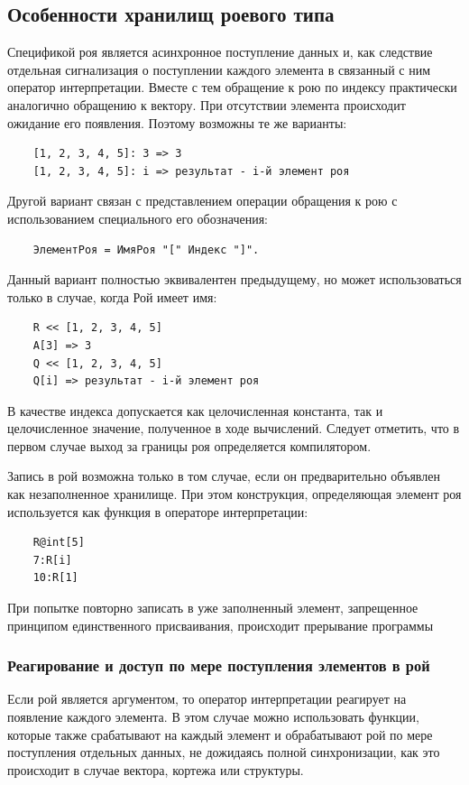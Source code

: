 \subsection{Особенности хранилищ роевого типа}

Спецификой роя является асинхронное поступление данных и, как следствие отдельная сигнализация о поступлении каждого элемента в связанный с ним оператор интерпретации. Вместе с тем обращение к рою по индексу практически аналогично обращению к вектору. При отсутствии элемента происходит ожидание его появления. Поэтому возможны те же варианты:
\begin{verbatim}
    [1, 2, 3, 4, 5]: 3 => 3
    [1, 2, 3, 4, 5]: i => результат - i-й элемент роя
\end{verbatim}

Другой вариант связан с представлением операции обращения к рою с использованием специального его обозначения:
\begin{verbatim}
    ЭлементРоя = ИмяРоя "[" Индекс "]".
\end{verbatim}

Данный вариант полностью эквивалентен предыдущему, но может использоваться только в случае, когда Рой имеет имя:
\begin{verbatim}
    R << [1, 2, 3, 4, 5]
    A[3] => 3
    Q << [1, 2, 3, 4, 5]
    Q[i] => результат - i-й элемент роя
\end{verbatim}
В качестве индекса допускается как целочисленная константа, так и целочисленное значение, полученное в ходе вычислений. Следует отметить, что в первом случае выход за границы роя определяется компилятором.

Запись в рой возможна только в том случае, если он предварительно объявлен как незаполненное хранилище. При этом конструкция, определяющая элемент роя используется как функция в операторе интерпретации:
\begin{verbatim}
    R@int[5]
    7:R[i]
    10:R[1]
\end{verbatim}
При попытке повторно записать в уже заполненный элемент, запрещенное принципом единственного присваивания, происходит прерывание программы

\subsubsection{Реагирование и доступ по мере поступления элементов в рой}

Если рой является аргументом, то оператор интерпретации реагирует на появление каждого элемента. В этом случае можно использовать функции, которые также срабатывают на каждый элемент и обрабатывают рой по мере поступления отдельных данных, не дожидаясь полной синхронизации, как это происходит в случае вектора, кортежа или структуры.

